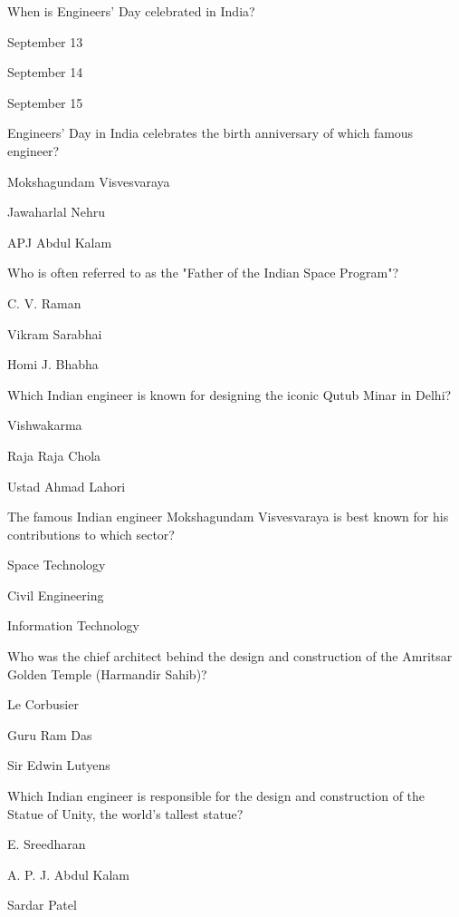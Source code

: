 
\begin{enhancedmcq}{When is Engineers' Day celebrated in India?}
\item September 13
\item September 14
\item September 15

\end{enhancedmcq}
\begin{enhancedmcq}{Engineers' Day in India celebrates the birth anniversary of which famous engineer?}
\item Mokshagundam Visvesvaraya
\item Jawaharlal Nehru
\item APJ Abdul Kalam

\end{enhancedmcq}
\begin{enhancedmcq}{Who is often referred to as the "Father of the Indian Space Program"?}
\item C. V. Raman
\item Vikram Sarabhai
\item Homi J. Bhabha

\end{enhancedmcq}
\begin{enhancedmcq}{Which Indian engineer is known for designing the iconic Qutub Minar in Delhi?}
\item Vishwakarma
\item Raja Raja Chola
\item Ustad Ahmad Lahori

\end{enhancedmcq}
\begin{enhancedmcq}{The famous Indian engineer Mokshagundam Visvesvaraya is best known for his contributions to which sector?}
\item Space Technology
\item Civil Engineering
\item Information Technology

\end{enhancedmcq}
\begin{enhancedmcq}{Who was the chief architect behind the design and construction of the Amritsar Golden Temple (Harmandir Sahib)?}
\item Le Corbusier
\item Guru Ram Das
\item Sir Edwin Lutyens

\end{enhancedmcq}
\begin{enhancedmcq}{Which Indian engineer is responsible for the design and construction of the Statue of Unity, the world's tallest statue?}
\item E. Sreedharan
\item A. P. J. Abdul Kalam
\item Sardar Patel

\end{enhancedmcq}
